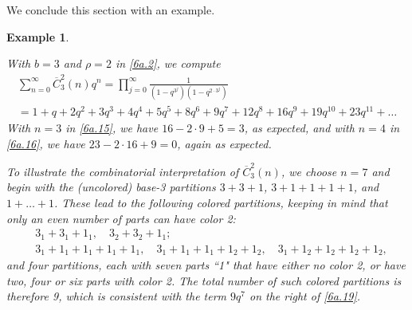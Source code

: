 \documentclass{amsart}
\theoremstyle{plain}
\newtheorem{example}[theorem]{Example}
\numberwithin{equation}{section}
\begin{document}
We conclude this section with an example.

\begin{example}\label{ex:6.17}
{\rm With $b=3$ and $\rho=2$ in \eqref{6a.2}, we compute
\begin{gather}
\sum_{n=0}^\infty\overline{C}_3^2(n)q^n
=\prod_{j=0}^\infty\frac{1}{\left(1-q^{3^j}\right)\left(1-q^{2\cdot 3^j}\right)}\label{6a.19} \\
=1+q+2q^2+3q^3+4q^4+5q^5+8q^6+9q^7+12q^8+16q^9+19q^{10}+23q^{11}+\dots \nonumber
\end{gather}
With $n=3$ in \eqref{6a.15}, we have $16-2\cdot 9+5=3$, as expected, and with 
$n=4$ in \eqref{6a.16}, we have $23-2\cdot 16+9=0$, again as expected.

To illustrate the combinatorial interpretation of $\overline{C}_3^2(n)$, we
choose $n=7$ and begin with the (uncolored) base-3 partitions $3+3+1$, 
$3+1+1+1+1$, and $1+\dots+1$. These lead to the following colored partitions,
keeping in mind that only an even number of parts can have color 2:
\begin{align*}
&3_1+3_1+1_1,\quad 3_2+3_2+1_1;\\
&3_1+1_1+1_1+1_1+1_1,\quad 3_1+1_1+1_1+1_2+1_2,\quad 3_1+1_2+1_2+1_2+1_2,
\end{align*}
and four partitions, each with seven parts ``1" that have either no color 2, or
have two, four or six parts with color 2. The total number of such colored
partitions is therefore 9, which is consistent with the term $9q^7$ on the
right of \eqref{6a.19}.}
\end{example}
\end{document}
